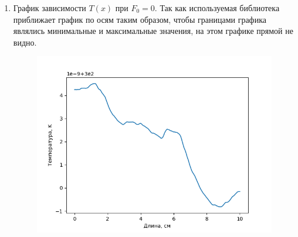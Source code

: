 \begin{enumerate}
\item График зависимости $T(x)$ при $F_0 = 0$.
Так как используемая библиотека приближает график по осям таким образом, чтобы границами графика являлись минимальные и максимальные значения, на этом графике прямой не видно.
\begin{figure}[H]
    \centering
    \includegraphics[scale=0.9]{data/pdf/Figure_5.png}
\end{figure}


\end{enumerate}
